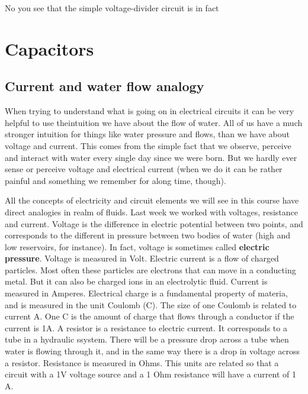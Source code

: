 \documentclass[a4paper]{scrartcl}
\begin{document}
No you see that the simple voltage-divider circuit is in fact 
\section{Capacitors}
\label{sec-2}

\subsection{Current and water flow analogy}
\label{sec-2-1}
When trying to understand what is going on in electrical circuits it can be very helpful to use theintuition we have about the flow of water. All of us have a much stronger intuition for things like water pressure and flows, than we have about voltage and current. This comes from the simple fact that we observe, perceive and interact with water every single day since we were born. But we hardly ever sense or perceive voltage and electrical current (when we do it can be rather painful and something we remember for along time, though). 

   All the concepts of electricity and circuit elements we will see in this course have direct analogies in realm of fluids. Last week we worked with voltages, resistance and current. Voltage is the difference in electric potential between two points, and corresponds to the different in pressure between two bodies of water (high and low reservoirs, for instance). In fact, voltage is sometimes called \textbf{electric pressure}. Voltage is measured in Volt. 
   Electric current is a flow of charged particles. Most often these particles are electrons that can move in a conducting metal. But it can also be charged ions in an electrolytic fluid. Current is measured in Amperes. Electrical charge is a fundamental property of materia, and is measured in the unit Coulomb (C). The size of one Coulomb is related to current A. One C is the amount of charge that flows through a conductor if the current is 1A. 
A resistor is a resistance to electric current. It corresponds to a tube in a hydraulic ssystem.   There will be a pressure drop across a tube when water is flowing through it, and in the same way there is a drop in voltage across a resistor. Resistance is measured in Ohms. This units are related so that a circuit with a 1V voltage source and a 1 Ohm resistance will have a current of 1 A.
\end{document}
